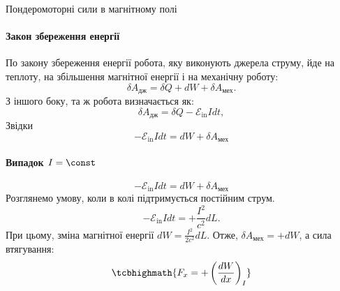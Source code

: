 \documentclass[onlytextwidth]{beamer}
\begin{document}
\begin{frame}{Пондеромоторні сили в магнітному полі}{}
	\framesubtitle<1>{Закон збереження енергії}
	\begin{center}
		\begin{pict}
		\end{pict}
	\end{center}
	\begin{overprint}
		\begin{block}{}\justifying
			По \alert{закону збереження енергії} \alert{робота, яку виконують джерела струму}, йде на теплоту, на збільшення магнітної енергії і на
			механічну роботу:
			\begin{equation*}
				\delta A_\text{дж} = \delta Q + dW + \delta A_\text{мех}.
			\end{equation*}
			З іншого боку, та ж робота визначається як:
			\begin{equation*}
				\delta A_\text{дж} = \delta Q - \mathcal{E}_\text{in} I dt,
			\end{equation*}
			Звідки
			\begin{equation*}
				- \mathcal{E}_\text{in} I dt = dW + \delta A_\text{мех}
			\end{equation*}
		\end{block}
		\framesubtitle<2>{Випадок $I = \const$}
		\begin{equation*}
			-\mathcal{E}_\text{in} I dt = dW + \delta A_\text{мех}
		\end{equation*}
		Розглянемо умову, коли в колі підтримується постійним струм.
		\begin{equation*}
			- \mathcal{E}_\text{in} I dt = + \frac{I^2}{c^2} dL.
		\end{equation*}
		При цьому, зміна магнітної енергії $dW = \frac{I^2}{2c^2} dL$. Отже, $\delta A_\text{мех} = + dW$, а сила втягування:
		\begin{equation*}
			\tcbhighmath{F_x = + \left( \frac{d W}{dx} \right)_{I}}

\end{equation*}
\end{overprint}
\end{frame}
\end{document}
